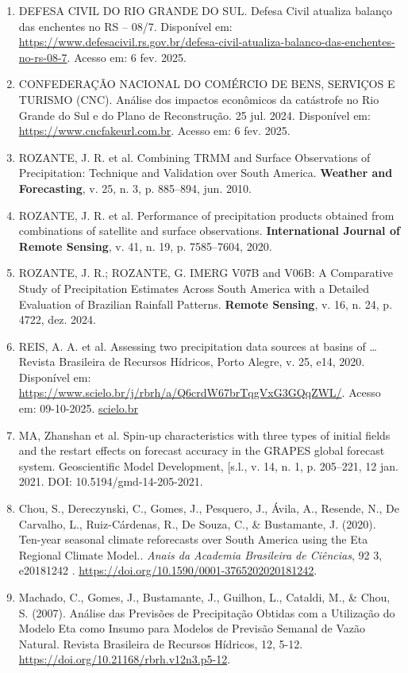 \documentclass[12pt,a4paper,oneside]{book}
\begin{document}
\begin{enumerate}
\item
  DEFESA CIVIL DO RIO GRANDE DO SUL. Defesa Civil atualiza balanço das enchentes no RS -- 08/7. Disponível em: \url{https://www.defesacivil.rs.gov.br/defesa-civil-atualiza-balanco-das-enchentes-no-rs-08-7}. Acesso em: 6 fev. 2025.
\item
  CONFEDERAÇÃO NACIONAL DO COMÉRCIO DE BENS, SERVIÇOS E TURISMO (CNC). Análise dos impactos econômicos da catástrofe no Rio Grande do Sul e do Plano de Reconstrução. 25 jul. 2024. Disponível em: \url{https://www.cncfakeurl.com.br}. Acesso em: 6 fev. 2025.
\item
  ROZANTE, J. R. et al. Combining TRMM and Surface Observations of Precipitation: Technique and Validation over South America. \textbf{Weather and Forecasting}, v. 25, n. 3, p. 885--894, jun. 2010.
\item
  ROZANTE, J. R. et al. Performance of precipitation products obtained from combinations of satellite and surface observations. \textbf{International Journal of Remote Sensing}, v. 41, n. 19, p. 7585--7604, 2020.
\item
  ROZANTE, J. R.; ROZANTE, G. IMERG V07B and V06B: A Comparative Study of Precipitation Estimates Across South America with a Detailed Evaluation of Brazilian Rainfall Patterns. \textbf{Remote Sensing}, v. 16, n. 24, p. 4722, dez. 2024.
\item
  REIS, A. A. et al. Assessing two precipitation data sources at basins of \ldots{} Revista Brasileira de Recursos Hídricos, Porto Alegre, v. 25, e14, 2020. Disponível em: \url{https://www.scielo.br/j/rbrh/a/Q6crdW67brTqgVxG3GQqZWL/}. Acesso em: 09-10-2025. \href{https://www.scielo.br/j/rbrh/a/Q6crdW67brTqgVxG3GQqZWL/?format=pdf&lang=en&utm_source=chatgpt.com}{scielo.br}
\item
  MA, Zhanshan et al. Spin-up characteristics with three types of initial fields and the restart effects on forecast accuracy in the GRAPES global forecast system. Geoscientific Model Development, {[}s.l., v. 14, n. 1, p. 205--221, 12 jan. 2021. DOI: 10.5194/gmd-14-205-2021.
\item
  Chou, S., Dereczynski, C., Gomes, J., Pesquero, J., Ávila, A., Resende, N., De Carvalho, L., Ruiz-Cárdenas, R., De Souza, C., \& Bustamante, J. (2020). Ten-year seasonal climate reforecasts over South America using the Eta Regional Climate Model.. \emph{Anais da Academia Brasileira de Ciências}, 92 3, e20181242 . \url{https://doi.org/10.1590/0001-3765202020181242}.
\item
  Machado, C., Gomes, J., Bustamante, J., Guilhon, L., Cataldi, M., \& Chou, S. (2007). Análise das Previsões de Precipitação Obtidas com a Utilização do Modelo Eta como Insumo para Modelos de Previsão Semanal de Vazão Natural. Revista Brasileira de Recursos Hídricos, 12, 5-12. \url{https://doi.org/10.21168/rbrh.v12n3.p5-12}.

\end{enumerate}
\end{document}
